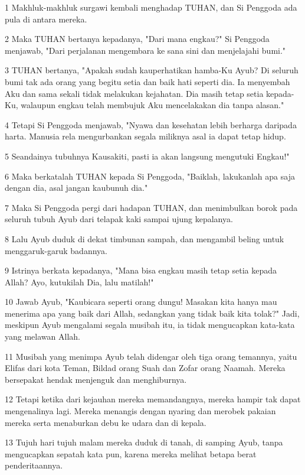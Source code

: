 \par 1 Makhluk-makhluk surgawi kembali menghadap TUHAN, dan Si Penggoda ada pula di antara mereka.
\par 2 Maka TUHAN bertanya kepadanya, "Dari mana engkau?" Si Penggoda menjawab, "Dari perjalanan mengembara ke sana sini dan menjelajahi bumi."
\par 3 TUHAN bertanya, "Apakah sudah kauperhatikan hamba-Ku Ayub? Di seluruh bumi tak ada orang yang begitu setia dan baik hati seperti dia. Ia menyembah Aku dan sama sekali tidak melakukan kejahatan. Dia masih tetap setia kepada-Ku, walaupun engkau telah membujuk Aku mencelakakan dia tanpa alasan."
\par 4 Tetapi Si Penggoda menjawab, "Nyawa dan kesehatan lebih berharga daripada harta. Manusia rela mengurbankan segala miliknya asal ia dapat tetap hidup.
\par 5 Seandainya tubuhnya Kausakiti, pasti ia akan langsung mengutuki Engkau!"
\par 6 Maka berkatalah TUHAN kepada Si Penggoda, "Baiklah, lakukanlah apa saja dengan dia, asal jangan kaubunuh dia."
\par 7 Maka Si Penggoda pergi dari hadapan TUHAN, dan menimbulkan borok pada seluruh tubuh Ayub dari telapak kaki sampai ujung kepalanya.
\par 8 Lalu Ayub duduk di dekat timbunan sampah, dan mengambil beling untuk menggaruk-garuk badannya.
\par 9 Istrinya berkata kepadanya, "Mana bisa engkau masih tetap setia kepada Allah? Ayo, kutukilah Dia, lalu matilah!"
\par 10 Jawab Ayub, "Kaubicara seperti orang dungu! Masakan kita hanya mau menerima apa yang baik dari Allah, sedangkan yang tidak baik kita tolak?" Jadi, meskipun Ayub mengalami segala musibah itu, ia tidak mengucapkan kata-kata yang melawan Allah.
\par 11 Musibah yang menimpa Ayub telah didengar oleh tiga orang temannya, yaitu Elifas dari kota Teman, Bildad orang Suah dan Zofar orang Naamah. Mereka bersepakat hendak menjenguk dan menghiburnya.
\par 12 Tetapi ketika dari kejauhan mereka memandangnya, mereka hampir tak dapat mengenalinya lagi. Mereka menangis dengan nyaring dan merobek pakaian mereka serta menaburkan debu ke udara dan di kepala.
\par 13 Tujuh hari tujuh malam mereka duduk di tanah, di samping Ayub, tanpa mengucapkan sepatah kata pun, karena mereka melihat betapa berat penderitaannya.

